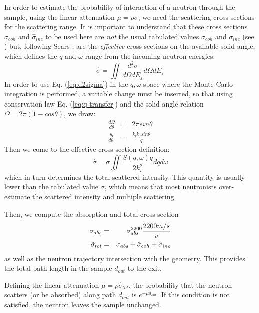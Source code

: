 In order to estimate the probability of interaction of a neutron through the sample, using the linear attenuation $\mu = \rho \sigma$, we need the scattering cross sections for the scattering range.
It is important to understand that these cross sections $\hat{\sigma}_{coh}$ and $\hat{\sigma}_{inc}$ to be used here are \emph{not} the usual tabulated values $\sigma_{coh}$ and $\sigma_{inc}$ (see \cite{ILLblue}) but, following Sears \cite{Sears75}, are the \emph{effective} cross sections on the available solid angle, which defines the $q$ and $\omega$ range from the incoming neutron energies:
\begin{equation}
\hat{\sigma} = \iint \frac{d^2 \sigma}{d\Omega dE_f} d\Omega dE_f
\end{equation}
In order to use Eq. (\ref{eq:d2sigma}) in the $q,\omega$ space where the Monte Carlo integration is performed, a variable change must be inserted, so that using conservation law Eq. (\ref{eq:q-transfer}) and the solid angle relation $\Omega=2\pi(1-cos \theta)$, we draw:
\begin{eqnarray}\label{eq:dqdw}
\frac{d\Omega}{d\theta} &=& 2\pi sin \theta \\
\frac{dq}{d\theta} &=& \frac{k_i k_f sin \theta}{q}
\end{eqnarray}
Then we come to the effective cross section definition:
\begin{equation}
\hat{\sigma} = \sigma \iint \frac{S(q,\omega) q}{2 k_i^2} dq d\omega
\end{equation}
which in turn determines the total scattered intensity. This quantity is usually lower than the tabulated value $\sigma$, which means that most neutronists over-estimate the scattered intensity and multiple scattering.

Then, we compute the absorption and total cross-section
\begin{eqnarray}
\sigma_{abs} &=& \sigma_{abs}^{{\rm 2200}}\frac{2200 m/s}{v} \\
\hat{\sigma}_{tot} &=& \sigma_{abs} + \hat{\sigma}_{coh} + \hat{\sigma}_{inc}
\end{eqnarray}
as well as the neutron trajectory intersection with the geometry. This provides the total path length in the sample $d_{out}$ to the exit.

Defining the linear attenuation $\mu = \rho\hat{\sigma}_{tot}$, the probability that the neutron scatters (or be absorbed) along path $d_{out}$ is $e^{-\mu d_{out}}$. If this condition is not satisfied, the neutron leaves the sample unchanged.

